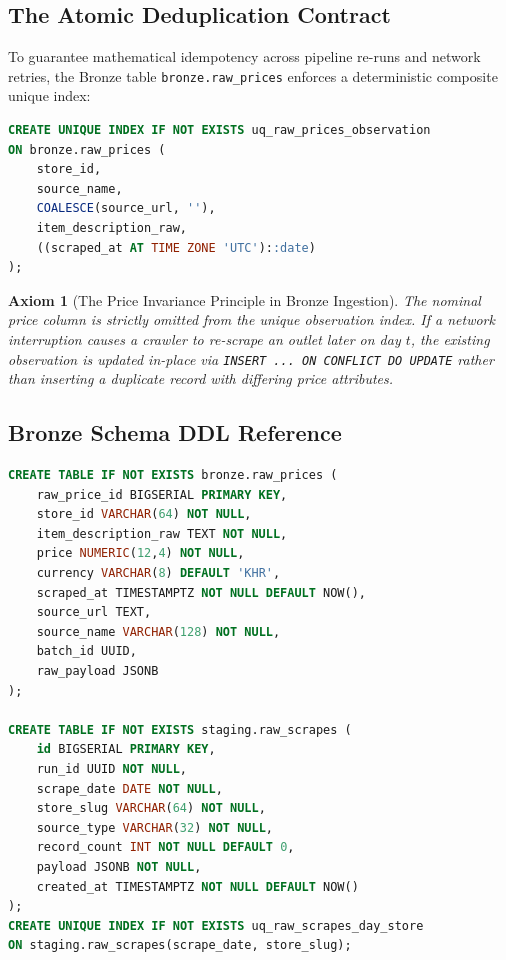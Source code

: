 \documentclass[11pt,a4paper]{article}
\newtheorem{axiom}{Axiom}
\begin{document}
\subsection{The Atomic Deduplication Contract}
To guarantee mathematical idempotency across pipeline re-runs and network retries, the Bronze table \texttt{bronze.raw\_prices} enforces a deterministic composite unique index:
\begin{lstlisting}[language=SQL]
CREATE UNIQUE INDEX IF NOT EXISTS uq_raw_prices_observation 
ON bronze.raw_prices (
    store_id, 
    source_name, 
    COALESCE(source_url, ''), 
    item_description_raw, 
    ((scraped_at AT TIME ZONE 'UTC')::date)
);
\end{lstlisting}

\begin{axiom}[The Price Invariance Principle in Bronze Ingestion]
The nominal price column is strictly omitted from the unique observation index. If a network interruption causes a crawler to re-scrape an outlet later on day $t$, the existing observation is updated in-place via \texttt{INSERT ... ON CONFLICT DO UPDATE} rather than inserting a duplicate record with differing price attributes.
\end{axiom}

\subsection{Bronze Schema DDL Reference}
\begin{lstlisting}[language=SQL]
CREATE TABLE IF NOT EXISTS bronze.raw_prices (
    raw_price_id BIGSERIAL PRIMARY KEY,
    store_id VARCHAR(64) NOT NULL,
    item_description_raw TEXT NOT NULL,
    price NUMERIC(12,4) NOT NULL,
    currency VARCHAR(8) DEFAULT 'KHR',
    scraped_at TIMESTAMPTZ NOT NULL DEFAULT NOW(),
    source_url TEXT,
    source_name VARCHAR(128) NOT NULL,
    batch_id UUID,
    raw_payload JSONB
);

CREATE TABLE IF NOT EXISTS staging.raw_scrapes (
    id BIGSERIAL PRIMARY KEY,
    run_id UUID NOT NULL,
    scrape_date DATE NOT NULL,
    store_slug VARCHAR(64) NOT NULL,
    source_type VARCHAR(32) NOT NULL,
    record_count INT NOT NULL DEFAULT 0,
    payload JSONB NOT NULL,
    created_at TIMESTAMPTZ NOT NULL DEFAULT NOW()
);
CREATE UNIQUE INDEX IF NOT EXISTS uq_raw_scrapes_day_store 
ON staging.raw_scrapes(scrape_date, store_slug);
\end{lstlisting}

\newpage
\end{document}
